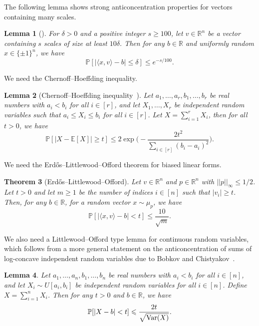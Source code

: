 \documentclass[reqno]{amsart}
\newtheorem{theorem}{Theorem}
\newtheorem{lemma}[theorem]{Lemma}
\theoremstyle{remark}
\theoremstyle{definition}
\numberwithin{theorem}{section}
\renewcommand{\(}{\bigl(}
\renewcommand{\)}{\bigr)\vphantom{)}}
\newcommand{\E}{\mathbb{E}}
\renewcommand{\le}{\leqslant}
\renewcommand{\ge}{\geqslant}
\renewcommand{\P}{\mathbb{P}}
\newcommand{\R}{\mathbb R}
\newcommand{\ang}[1]{\langle#1\rangle}
\newcommand{\bin}{\{\pm 1\}}
\newcommand{\var}{\textup{Var}}
\begin{document}
The following lemma shows strong anticoncentration properties for vectors containing many scales.
\begin{lemma}[\cite{yehuda2021slicing}]\label{lem:many-scale-anticoncentration}
    For $\delta > 0$ and a positive integer $s\ge 100$, let $v\in \R^n$ be a vector containing $s$ scales of size at least $10\delta$. Then for any $b\in \R$ and uniformly random $x\in \bin^n$, we have 
    \[\P[|\ang{x,v} - b| \le \delta] \le e^{-s/100}.\]
\end{lemma}

We need the Chernoff--Hoeffding inequality.

\begin{lemma}[Chernoff--Hoeffding inequality~\cite{Hoeffding1963}]\label{lem:chernoff}
    Let $a_1,\dots,a_r,b_1,\dots,b_r$ be real numbers with $a_i<b_i$ for all $i\in [r]$, and let $X_1,\dots, X_r$ be independent random variables such that $a_i\le X_i\le b_i$ for all $i\in [r]$. Let $X = \sum_{i = 1}^r X_i$, then for all $t > 0$, we have
    \[\P[|X - \E[X]| \ge t] \le 2\exp\Big(-\frac{2t^2}{\sum_{i \in [r]}(b_i-a_i)^2}\Big).\]
\end{lemma}

We need the Erd\H{o}s--Littlewood--Offord theorem for biased linear forms.

\begin{theorem}[Erd\H{o}s--Littlewood--Offord]\label{thm:littlewood-offord}
    Let $v\in \R^n$ and $p\in \R^n$ with $||p||_\infty\le 1/2$. Let $t>0$ and let $m\ge 1$ be the number of indices $i\in [n]$ such that $|v_i|\ge t$. Then, for any $b\in \R$, for a random vector $x\sim \mu_p$, we have
    \[\P[|\ang{x,v} - b| < t] \le \frac{10}{\sqrt{m}}.\]
\end{theorem}


We also need a Littlewood--Offord type lemma for continuous random variables, which follows from a more general statement on the anticoncentration of sums of log-concave independent random variables due to Bobkov and Chistyakov~\cite{BobkovChistyakov2015-ConcentrationFunctions}.

\begin{lemma}\label{lem:continuous-littlewood-offord}
    Let $a_1,\dots, a_n, b_1,\dots, b_n$ be real numbers with $a_i<b_i$ for all $i\in [n]$, and let $X_i\sim U[a_i, b_i]$ be independent random variables for all $i\in [n]$. Define $X = \sum_{i = 1}^n X_i$. Then for any $t>0$ and $b\in \R$, we have
    \[\P[|X - b| < t]\le \frac{2t}{\sqrt{\var(X)}}.\]
\end{lemma}
\end{document}
